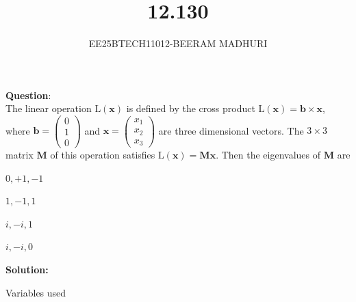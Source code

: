 \documentclass[journal]{IEEEtran}
\begin{document}

\vspace{3cm}

\title{12.130}
\author{EE25BTECH11012-BEERAM MADHURI}
{\let\newpage\relax\maketitle}

\renewcommand{\thefigure}{\theenumi}
\renewcommand{\thetable}{\theenumi}
\setlength{\intextsep}{10pt} %


\renewcommand{\thetable}{\theenumi}


\textbf{Question}:\\
The linear operation $\mathrm{L}(\mathbf{x})$ is defined by the cross product $\mathrm{L}(\mathbf{x}) = \mathbf{b} \times \mathbf{x}$, where $\mathbf{b} = 
\begin{pmatrix}
0 \\
1 \\
0
\end{pmatrix}$ and $\mathbf{x} = \begin{pmatrix}
x_1 \\
x_2 \\
x_3
\end{pmatrix}$ are three dimensional vectors. The $3 \times 3$ matrix $\mathbf{M}$ of this operation satisfies $\mathrm{L}(\mathbf{x}) = \mathbf{M}\mathbf{x}$. Then the eigenvalues of $\mathbf{M}$ are

\begin{enumerate}[label=(\alph*)]
\begin{multicols}{2}
    \item $0, +1, -1$
    \item $1, -1, 1$
    \item $i, -i, 1$
    \item $i, -i, 0$
    \end{multicols}
\end{enumerate}
\textbf{Solution:}\\
\begin{table}[h!]
    \centering
    
    \caption{Variables used}
    \label{table 1.9.1}
\end{table}\\
\end{document}
